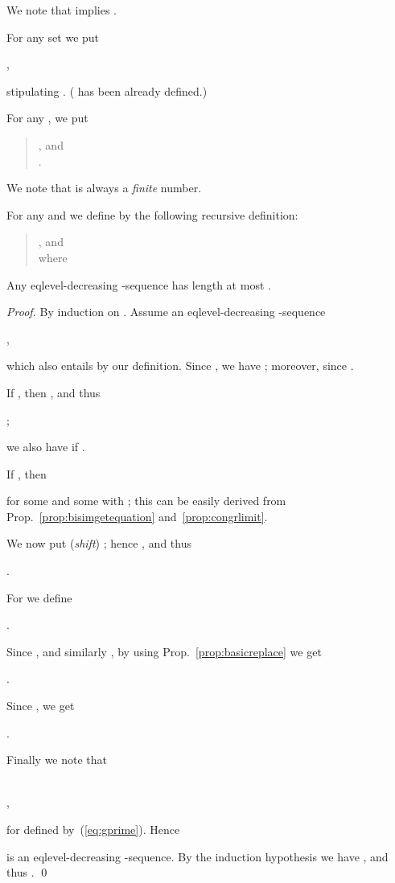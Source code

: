 \documentclass{llncs}
\begin{document}
We note that  implies .

For any set  we put 
\begin{center}
,
\end{center}
stipulating .
( has been already defined.)

For any , we put
\begin{quote}
, and
\\
.
\end{quote}
We note that  is always a \emph{finite} number.

For any  and
 we define 
by the following recursive definition:
\begin{quote}
, and
\\
 where 
\end{quote}


\begin{lemma}\label{lem:realboundng}
Any eqlevel-decreasing -sequence has length at most 
.
\end{lemma}
\begin{proof}
By induction on .
Assume an eqlevel-decreasing -sequence 
\begin{center}
,
\end{center}
which also entails 
 by our definition.
Since ,
we have ; 
moreover,  since
.

If , then , and thus
\begin{center}
;
\end{center}
we also
have  if
.

If , then 
\begin{center}
 
\end{center}
for some  and some  with 
; this can be easily
derived from Prop.~\ref{prop:bisimgetequation} 
and~\ref{prop:congrlimit}.



We now put (\emph{shift}) ;
hence , and thus
\begin{center}
.
\end{center}
For 
we define
\begin{center}
.
\end{center}
Since , and similarly 
,
by using Prop.~\ref{prop:basicreplace} we get
\begin{center}
.
\end{center}
Since ,
we get 
\begin{center}
.
\end{center}
Finally we note that
\begin{center}
\\
,
\end{center}
for  defined by~(\ref{eq:gprime}).
Hence 
\begin{center}

\end{center}
is an eqlevel-decreasing -sequence.
By the induction hypothesis we have  
, and thus
.
\qed\end{proof}
\end{document}
